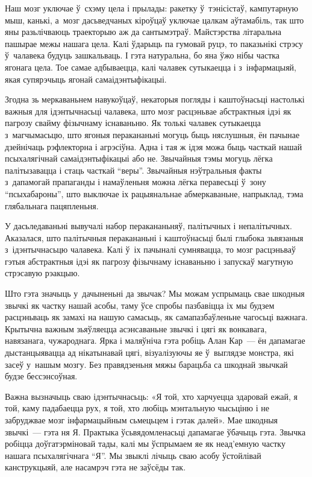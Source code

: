 Наш мозг уключае ў~схэму цела і прылады: ракетку ў~тэнісістаў, кампутарную мыш, канькі, а~мозг дасьведчаных кіроўцаў уключае цалкам аўтамабіль, так што яны разьлічваюць траекторыю аж да сантымэтраў. Майстэрства літаральна пашырае межы нашага цела. Калі ўдарыць па гумовай руцэ, то паказьнікі стрэсу ў~чалавека будуць зашкальваць. І гэта натуральна, бо яна ўжо нібы частка ягонага цела. Тое самае адбываецца, калі чалавек сутыкаецца і з~інфармацыяй, якая супярэчыць ягонай самаідэнтыфікацыі.

Згодна зь меркаваньнем навукоўцаў, некаторыя погляды і каштоўнасьці настолькі важныя для ідэнтычнасьці чалавека, што мозг расцэньвае абстрактныя ідэі як пагрозу свайму фізычнаму існаваньню. Як толькі чалавек сутыкаецца з~магчымасьцю, што ягоныя перакананьні могуць быць няслушныя, ён пачынае дзейнічаць рэфлекторна і агрэсіўна. Адна і тая ж ідэя можа быць часткай нашай псыхалягічнай самаідэнтыфікацыі або не. Звычайныя тэмы могуць лёгка палітызавацца і стаць часткай ``веры''. Звычайныя нэўтральныя факты з~дапамогай прапаганды і намаўленьня можна лёгка перавесьці ў~зону ``псыхабароны'', што выключае іх рацыянальнае абмеркаваньне, напрыклад, тэма глябальнага пацяпленьня.

У дасьледаваньні вывучалі набор перакананьняў, палітычных і непалітычных. Аказалася, што палітычныя перакананьні і каштоўнасьці былі глыбока зьвязаныя з~ідэнтычнасьцю чалавека. Калі ў~іх пачыналі сумнявацца, то мозг расцэньваў гэтыя абстрактныя ідэі як пагрозу фізычнаму існаваньню і запускаў магутную стрэсавую рэакцыю.

Што гэта значыць у~дачыненьні да звычак? Мы можам успрымаць свае шкодныя звычкі як частку нашай асобы, таму ўсе спробы пазбавіцца іх мы будзем расцэньваць як замахі на нашую самасьць, як самапазбаўленьне чагосьці важнага. Крытычна важным зьяўляецца асэнсаваньне звычкі і цягі як вонкавага, навязанага, чужароднага. Ярка і маляўніча гэта робіць Алан Кар~--- ён дапамагае дыстанцыявацца ад нікатынавай цягі, візуалізуючы яе ў~выглядзе монстра, які засеў у~нашым мозгу. Без правядзеньня мяжы барацьба са шкоднай звычкай будзе бессэнсоўная.

Важна вызначыць сваю ідэнтычнасьць: «Я той, хто харчуецца здаровай ежай, я той, каму падабаецца рух, я той, хто любіць мэнтальную чысьціню і не забруджвае мозг інфармацыйным сьмецьцем і гэтак далей». Мае шкодныя звычкі~--- гэта ня Я. Практыка ўсьвядомленасьці дапамагае ўбачыць гэта. Звычка робіцца доўгатэрміновай тады, калі мы ўспрымаем яе як неад'емную частку нашага псыхалягічнага ``Я''. Мы звыклі лічыць сваю асобу ўстойлівай канструкцыяй, але насамрэч гэта не заўсёды так. 


